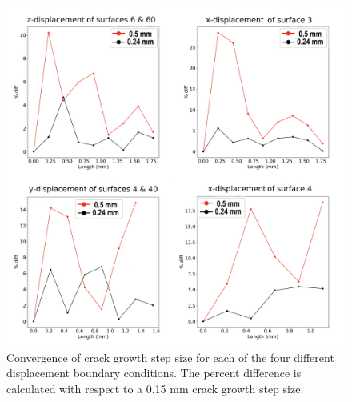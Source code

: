 \begin{figure}[h!]
\centering
\includegraphics[width=\textwidth,height=\textheight,keepaspectratio]{crack_convergence.png}
\caption{Convergence of crack growth step size for each of the four different
displacement boundary conditions. The percent difference is calculated with respect
to a 0.15 mm crack growth step size.
}
\label{fig:crack_convergence}
\end{figure}

